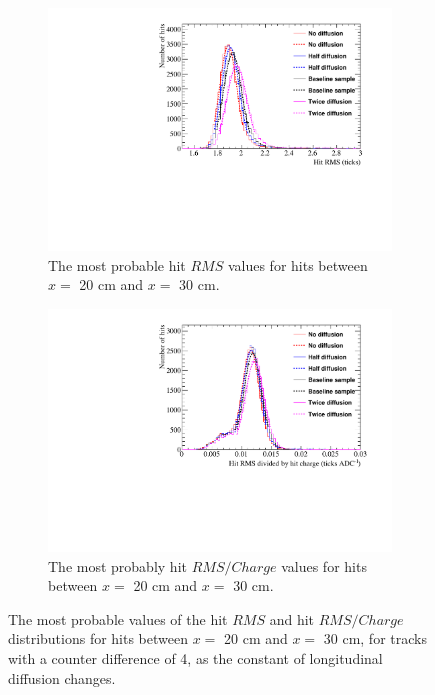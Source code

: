 \begin{figure}
  \centering
  \begin{subfigure}{0.48\textwidth}
    \centering
    \includegraphics[width=\textwidth]{Canvas_RMS_20cm_Diffusion}
    \caption{The most probable hit $RMS$ values for hits between $x =$ 20 cm and $x =$ 30 cm.}
  \end{subfigure}%
  \hspace{0.03\textwidth}%
  \begin{subfigure}{0.48\textwidth}
    \centering
    \includegraphics[width=\textwidth]{Canvas_RMS_Q_20cm_Diffusion}
    \caption{The most probably hit $RMS/Charge$ values for hits between $x =$ 20 cm and $x =$ 30 cm.}
  \end{subfigure}
  \caption[The most probable values of the hit $RMS$ and hit $RMS/Charge$ distributions for tracks with a counter difference of 4, as the constant of longitudinal diffusion changes]
          {The most probable values of the hit $RMS$ and hit $RMS/Charge$ distributions for hits between $x =$ 20 cm and $x =$ 30 cm, for tracks with a counter difference of 4, as the constant of longitudinal diffusion changes.}
  \label{fig:DiffLDiff_HitFit}
\end{figure}

